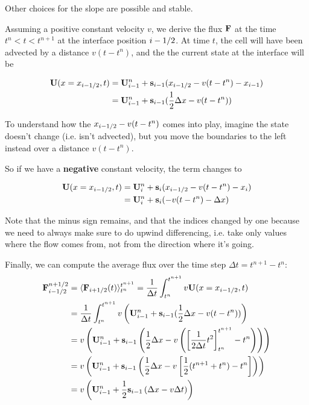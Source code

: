 Other choices for the slope are possible and stable.




Assuming a positive constant velocity $v$, we derive the flux $\mathbf{F}$ at the time $t^n < t < t^{n+1}$ at the interface position $i-1/2$.
At time $t$, the cell will have been advected by a distance $v (t - t^n)$, and the the current state at the interface will be

\begin{align*}
	\mathbf{U}(x=x_{i-1/2}, t) 
		&= \mathbf{U}_{i-1}^n + \mathbf{s}_{i-1} (x_{i-1/2} - v (t - t^n) - x_{i-1}) \\
		&= \mathbf{U}_{i-1}^n + \mathbf{s}_{i-1} (\frac{1}{2} \Delta x - v (t - t^n))
\end{align*}

To understand how the $x_{i-1/2} - v (t - t^n)$ comes into play, imagine the state doesn't change (i.e. isn't advected), but you move the boundaries to the left instead over a distance $v(t - t^n)$.

So if we have a \textbf{negative} constant velocity, the term changes to 

\begin{align*}
	\mathbf{U}(x=x_{i-1/2}, t) 
		&= \mathbf{U}_{i}^n + \mathbf{s}_{i} (x_{i-1/2} - v (t - t^n) - x_{i}) \\
		&= \mathbf{U}_{i}^n + \mathbf{s}_{i} (-v (t - t^n) - \Delta x)
\end{align*}



Note that the minus sign remains, and that the indices changed by one because we need to always make sure to do upwind differencing, i.e. take only values where the flow comes from, not from the direction where it's going.

Finally, we can compute the average flux over the time step $\Delta t = t^{n+1} - t^{n}$:
\begin{align}
	\mathbf{F}_{i-1/2}^{n+1/2} 
	&= \langle \mathbf{F}_{i+1/2}(t)\rangle _{t^n} ^ {t^{n+1}} 
	= \frac{1}{\Delta t} \int_{t^n}^{t^{n+1}} v \mathbf{U}(x 
	= x_{i-1/2}, t) \\
	&= \frac{1}{\Delta t} \int_{t^n}^{t^{n+1}} v \left( \mathbf{U}_{i-1}^n + \mathbf{s}_{i-1} (\frac{1}{2} \Delta x - v (t - t^n)) \right) \\
	&= v \left( \mathbf{U}_{i-1}^n  + \mathbf{s}_{i-1} \left( \frac{1}{2} \Delta x - v \left( \left[ \frac{1}{2 \Delta t} t^2 \right]_{t^n}^{t^{n+1}} - t^n \right)  \right) \right) \\
	&= v \left( \mathbf{U}_{i-1}^n  + \mathbf{s}_{i-1} \left( \frac{1}{2} \Delta x - v \left[ \frac{1}{2} (t^{n+1} + t^n) - t^n \right] \right) \right) \\
	&= v \left( \mathbf{U}_{i-1}^n  + \frac{1}{2} \mathbf{s}_{i-1} \left(\Delta x - v \Delta t \right) \right)
\end{align}



